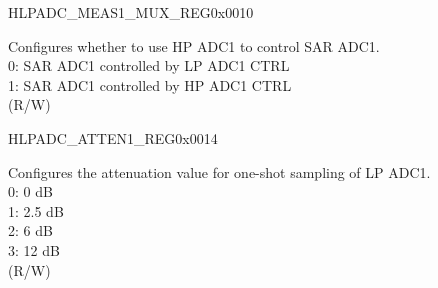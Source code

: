 \begin{register}{H}{LPADC\_MEAS1\_MUX\_REG}{0x0010}\label{regdesc:LPADCMEAS1MUXREG}
%
%
\regnewline%
\begin{regdesc}\begin{reglist}
\label{fielddesc:LPADCSAR1DIGFORCE}\item [LPADC\_SAR1\_DIG\_FORCE] Configures whether to use HP ADC1 to control SAR ADC1.\\
0: SAR ADC1 controlled by LP ADC1 CTRL \\
1: SAR ADC1 controlled by HP ADC1 CTRL \\
(R/W)
\end{reglist}\end{regdesc}
\end{register}


\begin{register}{H}{LPADC\_ATTEN1\_REG}{0x0014}\label{regdesc:LPADCATTEN1REG}
%
\regnewline%
\begin{regdesc}\begin{reglist}
\label{fielddesc:LPADCSAR1ATTEN}\item [LPADC\_SAR1\_ATTEN] Configures the attenuation value for one-shot sampling of LP ADC1.\\
0: 0 dB \\
1: 2.5 dB \\
2: 6 dB \\
3: 12 dB \\
(R/W)
\end{reglist}\end{regdesc}
\end{register}


